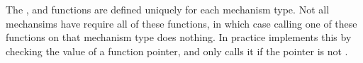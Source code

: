 
\begin{note}
    The ,  and  functions are defined uniquely for each mechanism type. Not all mechansims have require all of these functions, in which case calling one of these functions on that mechanism type does nothing. In practice \neuron implements this by checking the value of a function pointer, and only calls it if the pointer is not .
\end{note}
